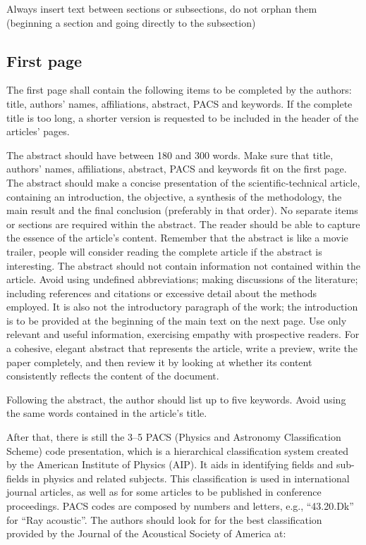 \documentclass[12pt, a4paper, twoside, twocolumn]{article}
\begin{document}
Always insert text between sections or subsections, do not orphan them (beginning a section and going directly to the subsection)

\subsection{First page}

The first page shall contain the following items to be completed by the authors: title, authors' names, affiliations, abstract, PACS and keywords. If the complete title is too long, a shorter version is requested to be included in the header of the articles' pages.

The abstract should have between 180 and 300 words. Make sure that title, authors' names, affiliations, abstract, PACS and keywords fit on the first page. The abstract should make a concise presentation of the scientific-technical article, containing an introduction, the objective, a synthesis of the methodology, the main result and the final conclusion (preferably in that order). No separate items or sections are required within the abstract. The reader should be able to capture the essence of the article's content. Remember that the abstract is like a movie trailer, people will consider reading the complete article if the abstract is interesting. The abstract should not contain information not contained within the article. Avoid using undefined abbreviations; making discussions of the literature; including references and citations or excessive detail about the methods employed. It is also not the introductory paragraph of the work; the introduction is to be provided at the beginning of the main text on the next page. Use only relevant and useful information, exercising empathy with prospective readers. For a cohesive, elegant abstract that represents the article, write a preview, write the paper completely, and then review it by looking at whether its content consistently reflects the content of the document.

Following the abstract, the author should list up to five keywords. Avoid using the same words contained in the article’s title.

After that, there is still the 3--5 PACS (Physics and Astronomy Classification Scheme) code presentation, which is a hierarchical classification system created by the American Institute of Physics (AIP). It aids in identifying fields and sub-fields in physics and related subjects. This classification is used in international journal articles, as well as for some articles to be published in conference proceedings. PACS codes are composed by numbers and letters, e.g., ``43.20.Dk'' for ``Ray acoustic''. The authors should look for for the best classification provided  by the Journal of the Acoustical Society of America at:
\end{document}
